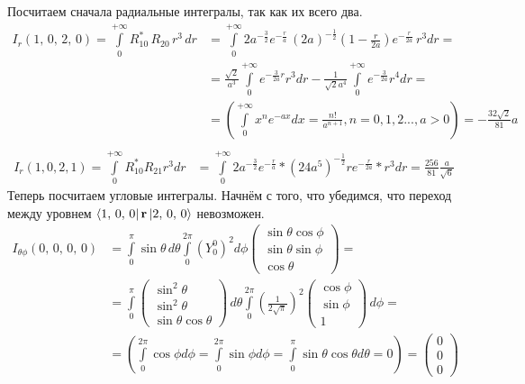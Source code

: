 Посчитаем сначала радиальные интегралы, так как их всего два.
\begin{align*}
    I_r(1,\,0,\,2,\,0) = \int\limits_{0}^{+\infty} R_{10}^*\,R_{20}\,r^3\,dr &= \int\limits_{0}^{+\infty} 2a^{-\frac{3}{2}} e^{-\frac{r}{a}} \, (2a)^{-\frac{1}{2}} (1 - \frac{r}{2a}) e^{-\frac{r}{2a}} \, r^3 dr = \\& = \frac{\sqrt{2}}{a^3} \int\limits_{0}^{+\infty} e^{-\frac{3}{2a}r} r^3 dr - \frac{1}{\sqrt{2}a^4} \int\limits_{0}^{+\infty} e^{-\frac{3}{2a}} r^4 dr = \\& = \left(\int\limits_{0}^{+\infty} x^n e^{-ax} dx = \frac{n!}{a^{n + 1}}, n = 0, 1, 2..., a > 0\right) = -\frac{32\sqrt{2}}{81} a \\
\end{align*}
\begin{align*}
    I_r(1, 0, 2, 1) = \int\limits_{0}^{+\infty} R_{10}^* R_{21} r^3 dr &= \int\limits_{0}^{+\infty} 2a^{-\frac{3}{2}} e^{-\frac{r}{a}} * (24a^5)^{-\frac{1}{2}} r e^{-\frac{r}{2a}} * r^3 dr = \frac{256}{81} \frac{a}{\sqrt{6}} 
\end{align*}
Теперь посчитаем угловые интегралы. Начнём с того, что убедимся, что переход между уровнем $\bra{1,\,0,\,0}\mathbf{r}\ket{2,\,0,\,0}$ невозможен.
\begin{align*}
    I_{\theta\phi}(0,\,0,\,0,\,0) &= \int\limits_{0}^{\pi}\sin\theta\,d\theta\int\limits_{0}^{2\pi}(Y^0_0)^2d\phi \begin{pmatrix} \sin\theta\cos\phi \\ \sin\theta\sin\phi \\ \cos\theta \end{pmatrix} = \\& = \int\limits_{0}^{\pi} \begin{pmatrix} \sin^2 \theta \\ \sin^2 \theta \\ \sin\theta\cos\theta \end{pmatrix} \, d\theta \int\limits_{0}^{2\pi} \left(\frac{1}{2\sqrt{\pi}}\right)^2 \begin{pmatrix} \cos\phi \\ \sin\phi \\ 1 \end{pmatrix} \, d\phi = \\& = \left( \int\limits_{0}^{2\pi} \cos\phi d\phi = \int\limits_{0}^{2\pi} \sin\phi d\phi = \int\limits_{0}^{\pi} \sin\theta \cos\theta d\theta = 0 \right) = \begin{pmatrix} 0 \\ 0 \\ 0
    \end{pmatrix}
\end{align*}

